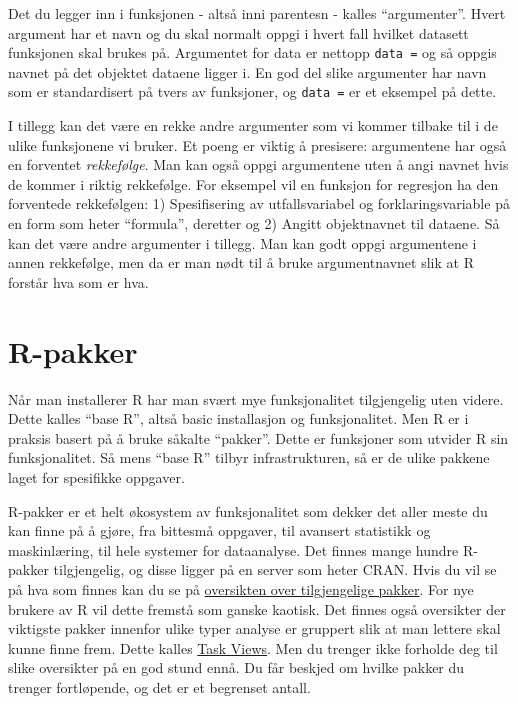\documentclass[
  letterpaper,
  DIV=11,
  numbers=noendperiod]{scrreprt}
\theoremstyle{definition}
\theoremstyle{remark}
\begin{document}
Det du legger inn i funksjonen - altså inni parentesn - kalles
``argumenter''. Hvert argument har et navn og du skal normalt oppgi i
hvert fall hvilket datasett funksjonen skal brukes på. Argumentet for
data er nettopp \texttt{data\ =} og så oppgis navnet på det objektet
dataene ligger i. En god del slike argumenter har navn som er
standardisert på tvers av funksjoner, og \texttt{data\ =} er et eksempel
på dette.

I tillegg kan det være en rekke andre argumenter som vi kommer tilbake
til i de ulike funksjonene vi bruker. Et poeng er viktig å presisere:
argumentene har også en forventet \emph{rekkefølge}. Man kan også oppgi
argumentene uten å angi navnet hvis de kommer i riktig rekkefølge. For
eksempel vil en funksjon for regresjon ha den forventede rekkefølgen: 1)
Spesifisering av utfallsvariabel og forklaringsvariable på en form som
heter ``formula'', deretter og 2) Angitt objektnavnet til dataene. Så
kan det være andre argumenter i tillegg. Man kan godt oppgi argumentene
i annen rekkefølge, men da er man nødt til å bruke argumentnavnet slik
at R forstår hva som er hva.

\hypertarget{r-pakker}{%
\section{R-pakker}\label{r-pakker}}

Når man installerer R har man svært mye funksjonalitet tilgjengelig uten
videre. Dette kalles ``base R'', altså basic installasjon og
funksjonalitet. Men R er i praksis basert på å bruke såkalte ``pakker''.
Dette er funksjoner som utvider R sin funksjonalitet. Så mens ``base R''
tilbyr infrastrukturen, så er de ulike pakkene laget for spesifikke
oppgaver.

R-pakker er et helt økosystem av funksjonalitet som dekker det aller
meste du kan finne på å gjøre, fra bittesmå oppgaver, til avansert
statistikk og maskinlæring, til hele systemer for dataanalyse. Det
finnes mange hundre R-pakker tilgjengelig, og disse ligger på en server
som heter CRAN. Hvis du vil se på hva som finnes kan du se på
\href{https://cran.r-project.org/web/packages/available_packages_by_name.html}{oversikten
over tilgjengelige pakker}. For nye brukere av R vil dette fremstå som
ganske kaotisk. Det finnes også oversikter der viktigste pakker innenfor
ulike typer analyse er gruppert slik at man lettere skal kunne finne
frem. Dette kalles \href{https://cran.r-project.org/index.html}{Task
Views}. Men du trenger ikke forholde deg til slike oversikter på en god
stund ennå. Du får beskjed om hvilke pakker du trenger fortløpende, og
det er et begrenset antall.
\end{document}
